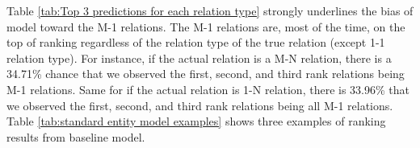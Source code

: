 Table \ref{tab:Top 3 predictions for each relation type} strongly underlines the bias of model toward the M-1 relations. The M-1 relations are, most of the time, on the top of ranking regardless of the relation type of the true relation (except 1-1 relation type). For instance, if the actual relation is a M-N relation, there is a 34.71\% chance that we observed the first, second, and third rank relations being M-1 relations. Same for if the actual relation is 1-N relation, there is 33.96\% that we observed the first, second, and third rank relations being all M-1 relations. 
Table \ref{tab:standard entity model examples} shows three examples of ranking results from baseline model.  

